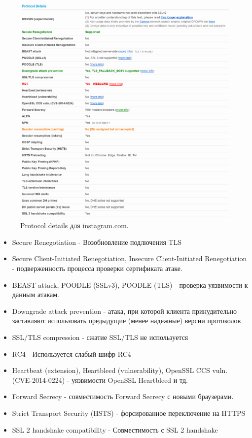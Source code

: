 \documentclass[10pt,a4paper]{article}
\begin{document}
\begin{figure}[h]
\centering
\includegraphics[width=\textwidth]{instagram_com_protocol_details}
\caption{Protocol details для instagram.com.}
\end{figure}

\begin{itemize}
\item{Secure Renegotiation - Возобновление подлючения TLS}
\item{Secure Client-Initiated Renegotiation, Insecure Client-Initiated Renegotiation - подверженность процесса проверки сертификата атаке.}
\item{BEAST attack, POODLE (SSLv3), POODLE (TLS) - проверка уязвимости к данным атакам.}
\item{Downgrade attack prevention - атака, при которой клиента принудительно заставляют использовать предыдущие (менее надежные) версии протоколов}
\item{SSL/TLS compression - сжатие SSL/TLS не используется}
\item{RC4 - Используется слабый шифр RC4}
\item{Heartbeat (extension), Heartbleed (vulnerability), OpenSSL CCS vuln. (CVE-2014-0224) - уязвимости OpenSSL Heartbleed и тд.}
\item{Forward Secrecy - совместимость Forward Secrecy с новыми браузерами.}
\item{Strict Transport Security (HSTS) - форсированное переключение на HTTPS}
\item{SSL 2 handshake compatibility - Совместимость с SSL 2 handshake}
\end{itemize}
\end{document}
